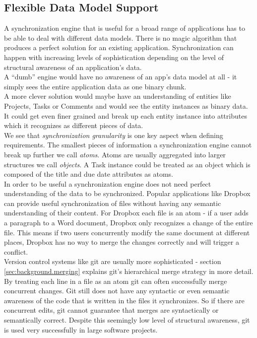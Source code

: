 \subsection{Flexible Data Model Support}
A synchronization engine that is useful for a broad range of applications has to be able to deal with different data models. There is no magic algorithm that produces a perfect solution for an existing application.
Synchronization can happen with increasing levels of sophistication depending on the level of structural awareness of an application's data.\\
A ``dumb'' engine would have no awareness of an app's data model at all - it simply sees the entire application data as one binary chunk.\\
A more clever solution would maybe have an understanding of entities like Projects, Tasks or Comments and would see the entity instances as binary data.\\
It could get even finer grained and break up each entity instance into attributes which it recognizes as different pieces of data.\\
We see that \emph{synchronization granularity} is one key aspect when defining requirements.
The smallest pieces of information a synchronization engine cannot break up further we call \emph{atoms}.
Atoms are usually aggregated into larger structures we call \emph{objects}.
A Task instance could be treated as an object which is composed of the title and due date attributes as atoms.\\
In order to be useful a synchronization engine does not need perfect understanding of the data to be synchronized.
Popular applications like Dropbox can provide useful synchronization of files without having any semantic understanding of their content.
For Dropbox each file is an atom - if a user adds a paragraph to a Word document, Dropbox only recognizes a change of the entire file.
This means if two users concurrently modify the same document at different places, Dropbox has no way to merge the changes correctly and will trigger a conflict.\\
Version control systems like git are usually more sophisticated - section \ref{sec:background.merging} explains git's hierarchical merge strategy in more detail.
By treating each line in a file as an atom git can often successfully merge concurrent changes.
Git still does not have any syntactic or even semantic awareness of the code that is written in the files it synchronizes.
So if there are concurrent edits, git cannot guarantee that merges are syntactically or semantically correct.
Despite this seemingly low level of structural awareness, git is used very successfully in large software projects.\\

